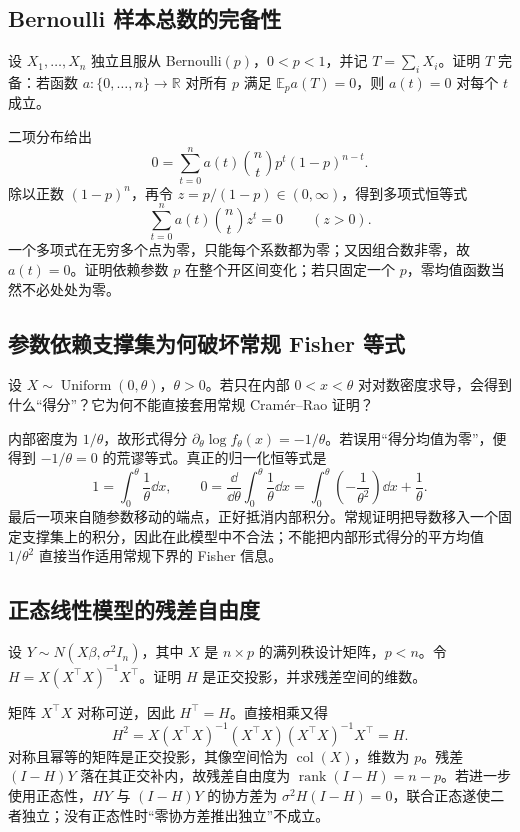 \subsection*{Bernoulli 样本总数的完备性}
设 \(X_1,\ldots,X_n\) 独立且服从 Bernoulli\((p)\)，\(0<p<1\)，并记 \(T=\sum_iX_i\)。证明 \(T\) 完备：若函数 \(a:\{0,\ldots,n\}\to\mathbb R\) 对所有 \(p\) 满足 \(\mathbb E_p a(T)=0\)，则 \(a(t)=0\) 对每个 \(t\) 成立。

二项分布给出
\[
0=\sum_{t=0}^n a(t){n\choose t}p^t(1-p)^{n-t}.
\]
除以正数 \((1-p)^n\)，再令 \(z=p/(1-p)\in(0,\infty)\)，得到多项式恒等式
\[
\sum_{t=0}^n a(t){n\choose t}z^t=0\qquad(z>0).
\]
一个多项式在无穷多个点为零，只能每个系数都为零；又因组合数非零，故 \(a(t)=0\)。证明依赖参数 \(p\) 在整个开区间变化；若只固定一个 \(p\)，零均值函数当然不必处处为零。

\subsection*{参数依赖支撑集为何破坏常规 Fisher 等式}
设 \(X\sim\operatorname{Uniform}(0,\theta)\)，\(\theta>0\)。若只在内部 \(0<x<\theta\) 对对数密度求导，会得到什么“得分”？它为何不能直接套用常规 Cramér--Rao 证明？

内部密度为 \(1/\theta\)，故形式得分 \(\partial_\theta\log f_\theta(x)=-1/\theta\)。若误用“得分均值为零”，便得到 \(-1/\theta=0\) 的荒谬等式。真正的归一化恒等式是
\[
1=\int_0^\theta\frac1\theta\dd x,\qquad
0=\frac{\dd}{\dd\theta}\int_0^\theta\frac1\theta\dd x
=\int_0^\theta\left(-\frac1{\theta^2}\right)\dd x+\frac1\theta.
\]
最后一项来自随参数移动的端点，正好抵消内部积分。常规证明把导数移入一个固定支撑集上的积分，因此在此模型中不合法；不能把内部形式得分的平方均值 \(1/\theta^2\) 直接当作适用常规下界的 Fisher 信息。

\subsection*{正态线性模型的残差自由度}
设 \(Y\sim N(X\beta,\sigma^2I_n)\)，其中 \(X\) 是 \(n\times p\) 的满列秩设计矩阵，\(p<n\)。令 \(H=X(X^\top X)^{-1}X^\top\)。证明 \(H\) 是正交投影，并求残差空间的维数。

矩阵 \(X^\top X\) 对称可逆，因此 \(H^\top=H\)。直接相乘又得
\[
H^2=X(X^\top X)^{-1}(X^\top X)(X^\top X)^{-1}X^\top=H.
\]
对称且幂等的矩阵是正交投影，其像空间恰为 \(\operatorname{col}(X)\)，维数为 \(p\)。残差 \((I-H)Y\) 落在其正交补内，故残差自由度为 \(\operatorname{rank}(I-H)=n-p\)。若进一步使用正态性，\(HY\) 与 \((I-H)Y\) 的协方差为 \(\sigma^2H(I-H)=0\)，联合正态遂使二者独立；没有正态性时“零协方差推出独立”不成立。
